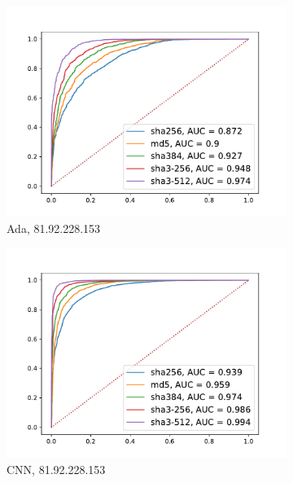 \documentclass[12pt,a4paper,automark, toc=bib]{scrreprt}
\theoremstyle{definition}
\begin{document}
\begin{figure}
\begin{subfigure}{0.32\linewidth}
					\includegraphics[width=\linewidth]{figures/81.92.228.153_50_AdaBoost.pdf}
					\caption{Ada, 81.92.228.153}
				\end{subfigure}
				\begin{subfigure}{0.32\linewidth}
					\centering
					\includegraphics[width=\linewidth]{figures/81.92.228.153_50_keras.pdf}
					\caption{CNN, 81.92.228.153}
				\end{subfigure}
				\begin{subfigure}{0.32\linewidth}
					\centering

\end{subfigure}
\end{figure}
\end{document}
